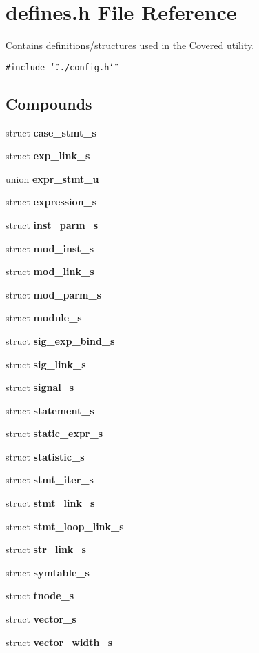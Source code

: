 \section{defines.h File Reference}
\label{defines_8h}
Contains definitions/structures used in the Covered utility. 


{\tt \#include \char`\"{}../config.h\char`\"{}}\par
\subsection*{Compounds}
\begin{CompactItemize}
\item 
struct {\bf case\_\-stmt\_\-s}
\item 
struct {\bf exp\_\-link\_\-s}
\item 
union {\bf expr\_\-stmt\_\-u}
\item 
struct {\bf expression\_\-s}
\item 
struct {\bf inst\_\-parm\_\-s}
\item 
struct {\bf mod\_\-inst\_\-s}
\item 
struct {\bf mod\_\-link\_\-s}
\item 
struct {\bf mod\_\-parm\_\-s}
\item 
struct {\bf module\_\-s}
\item 
struct {\bf sig\_\-exp\_\-bind\_\-s}
\item 
struct {\bf sig\_\-link\_\-s}
\item 
struct {\bf signal\_\-s}
\item 
struct {\bf statement\_\-s}
\item 
struct {\bf static\_\-expr\_\-s}
\item 
struct {\bf statistic\_\-s}
\item 
struct {\bf stmt\_\-iter\_\-s}
\item 
struct {\bf stmt\_\-link\_\-s}
\item 
struct {\bf stmt\_\-loop\_\-link\_\-s}
\item 
struct {\bf str\_\-link\_\-s}
\item 
struct {\bf symtable\_\-s}
\item 
struct {\bf tnode\_\-s}
\item 
struct {\bf vector\_\-s}
\item 
struct {\bf vector\_\-width\_\-s}
\end{CompactItemize}
